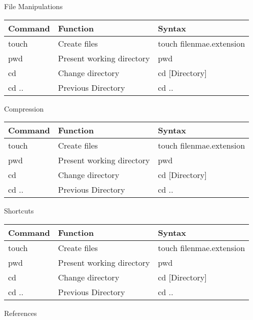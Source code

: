 \begin{frame}[t]{File Manipulations}\hfill
	\begin{center}
		\begin{tabular}{lll} 
			\textbf{Command} & \textbf{Function} & \textbf{Syntax} \\ 
			\hline
			touch & Create files & touch \color{red} filenmae.extension \\ 
			pwd & Present working directory & pwd \\ 
			cd & Change directory & \color{red}cd [Directory] \\ 
			cd .. & Previous Directory & \color{red} cd ..
		\end{tabular}
	\end{center}
\end{frame}



\begin{frame}[t]{Compression}\hfill
	\begin{center}
		\begin{tabular}{lll} 
			\textbf{Command} & \textbf{Function} & \textbf{Syntax} \\ 
			\hline
			touch & Create files & touch \color{red} filenmae.extension \\ 
			pwd & Present working directory & pwd \\ 
			cd & Change directory & \color{red}cd [Directory] \\ 
			cd .. & Previous Directory & \color{red} cd ..
		\end{tabular}
	\end{center}
\end{frame}






\begin{frame}[t]{Shortcuts}\hfill
	\begin{center}
		\begin{tabular}{lll} 
			\textbf{Command} & \textbf{Function} & \textbf{Syntax} \\ 
			\hline
			touch & Create files & touch \color{red} filenmae.extension \\ 
			pwd & Present working directory & pwd \\ 
			cd & Change directory & \color{red}cd [Directory] \\ 
			cd .. & Previous Directory & \color{red} cd ..
		\end{tabular}
	\end{center}
\end{frame}




\begin{frame}[t]{References}
	
\end{frame}


